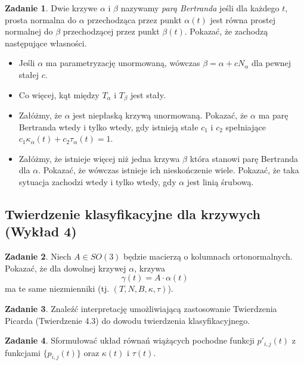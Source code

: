 \documentclass[a4paper,11pt]{article}
\theoremstyle{definition}\newtheorem{exercise}{Zadanie}
\theoremstyle{definition}\newtheorem{remark}{Uwaga}
\begin{document}
\begin{exercise}
Dwie krzywe $\alpha$ i $\beta$ nazywamy \textit{parą Bertranda} jeśli dla 
każdego $t$, prosta normalna do $\alpha$ przechodząca przez punkt $\alpha(t)$ 
jest r\'owna prostej normalnej do $\beta$ przechodzącej przez punkt $\beta(t)$.
Pokazać, że zachodzą następujące własności.

\begin{itemize}
 \item Jeśli $\alpha$ ma parametryzację unormowaną, w\'owczas $\beta=\alpha+ 
cN_\alpha$ dla pewnej stałej $c$. 
\item Co więcej, kąt między $T_{\alpha}$ i $T_\beta$ jest stały.
\item Zał\'ożmy, że $\alpha$ jest niepłaską krzywą unormowaną. Pokazać, że 
$\alpha$ ma parę Bertranda wtedy i tylko wtedy, gdy istnieją stałe $c_1$ i 
$c_2$ spełniające $c_1 \kappa_{\alpha} (t)+c_2 \tau_\alpha(t)=1$.

\item Zał\'ożmy, że istnieje więcej niż jedna krzywa $\beta$ kt\'ora stanowi 
parę Bertranda dla $\alpha$. Pokazać, że w\'owczas istnieje ich nieskończenie 
wiele. Pokazać, że taka sytuacja zachodzi wtedy i tylko wtedy, gdy $\alpha$ 
jest linią śrubową.
\end{itemize}



\end{exercise}

\subsection{Twierdzenie klasyfikacyjne dla krzywych (Wykład 4)}

\begin{exercise}
 Niech $A\in SO(3)$ będzie macierzą o kolumnach ortonormalnych. Pokazać, że dla 
dowolnej krzywej $\alpha$, krzywa
\[\gamma(t) = A\cdot \alpha(t)\]
ma te same niezmienniki (tj. $(T,N,B,\kappa,\tau)$).
\end{exercise}

\begin{exercise}
Znaleźć interpretację umożliwiającą zastosowanie Twierdzenia Picarda
(Twierdzenie 4.3) do dowodu twierdzenia klasyfikacyjnego. 
\end{exercise}

\begin{exercise}
Sformułować układ równań wiążących pochodne funkcji $p'_{i,j}(t)$ z funkcjami 
$\{p_{i,j}(t)\}$ oraz $\kappa(t)$ i $\tau(t)$.
\end{exercise}
\end{document}
